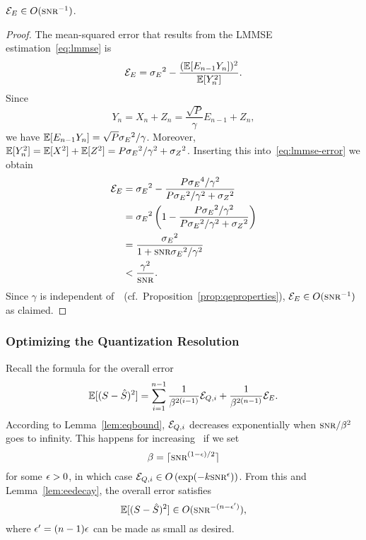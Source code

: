 \begin{lemma}
  \label{lem:eedecay}
  $\Ee \in O(\snr^{-1})$. 
\end{lemma}
\begin{proof}
  The mean-squared error that results from the LMMSE estimation~\eqref{eq:lmmse}
  is
  \begin{equation}
    \label{eq:lmmse-error}
    {{\mathcal{E}}_E} = {{\sigma_E}^2} - \frac{(\mathbb{E}[E_{n-1}
    Y_n])^2}{\mathbb{E}[Y_n^2]}. 
  \end{equation}
  Since
  \begin{equation*}
    Y_n = X_n + Z_n = \frac{\sqrt{P}}{\gamma} E_{n-1} + Z_n,
  \end{equation*}
  we have $\mathbb{E}[E_{n-1}Y_n] = \sqrt{P}{{\sigma_E}^2}/\gamma$. Moreover, $\mathbb{E}[Y_n^2] = \mathbb{E}[X^2]
  + \mathbb{E}[Z^2] = P{{\sigma_E}^2} / \gamma^2 +{{\sigma_Z}^2}$.  Inserting this
  into~\eqref{eq:lmmse-error} we obtain
  \begin{align*}
    \Ee &= \seq - \frac{P \se^4/\gamma^2}{P\seq/\gamma^2 + \szq} \\
    &= \seq \left( 1 - \frac{P\seq/\gamma^2}{P\seq/\gamma^2 + \szq} \right) \\
    &= \frac{\seq}{1 + \snr\seq/\gamma^2} \\
    & < \frac{\gamma^2}{\snr}.
  \end{align*}
  Since $\gamma$ is independent of~\snr\ (cf.\
  Proposition~\ref{prop:qeproperties}), $\Ee \in O(\snr^{-1})$ as claimed.
\end{proof}


\subsubsection{Optimizing the Quantization Resolution}

Recall the formula for the overall error
\begin{equation*}
  \mathbb{E}[(S-{\hat{S}})^2] = \sum_{i=1}^{n-1} \frac{1}{\beta^{2(i-1)}} {{\mathcal{E}}_{Q,i}} +
  \frac{1}{\beta^{2(n-1)}} {{\mathcal{E}}_E}.
\end{equation*}
According to Lemma~\ref{lem:eqbound}, ${{\mathcal{E}}_{Q,i}}$ decreases exponentially
when $\snr/\beta^2$ goes to infinity. This happens for increasing \snr\ if we
set \eg
\begin{equation*}
  \beta = \lceil \snr^{(1-\e)/2} \rceil
\end{equation*}
for some $\epsilon > 0$, in which case $\Eqi \in O\left(\exp(-k \snr^\e) \right)$.
From this and Lemma~\ref{lem:eedecay}, the overall error satisfies
\begin{equation}
  \label{eq:overallO}
  \E[(S-\Sh)^2] \in O(\snr^{-(n - \e')}),
\end{equation}
where $\epsilon' = (n-1)\epsilon$ can be made as small as desired.

